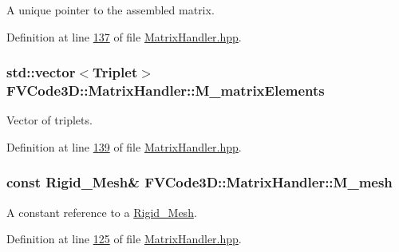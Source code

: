 A unique pointer to the assembled matrix. 



Definition at line \hyperlink{MatrixHandler_8hpp_source_l00137}{137} of file \hyperlink{MatrixHandler_8hpp_source}{Matrix\+Handler.\+hpp}.

\subsubsection[{\texorpdfstring{M\+\_\+matrix\+Elements}{M_matrixElements}}]{\setlength{\rightskip}{0pt plus 5cm}std\+::vector$<${\bf Triplet}$>$ F\+V\+Code3\+D\+::\+Matrix\+Handler\+::\+M\+\_\+matrix\+Elements\hspace{0.3cm}{\ttfamily [protected]}}\hypertarget{classFVCode3D_1_1MatrixHandler_a0bbdfb8d779ca20d8ba69b99cac1f4d6}{}\label{classFVCode3D_1_1MatrixHandler_a0bbdfb8d779ca20d8ba69b99cac1f4d6}


Vector of triplets. 



Definition at line \hyperlink{MatrixHandler_8hpp_source_l00139}{139} of file \hyperlink{MatrixHandler_8hpp_source}{Matrix\+Handler.\+hpp}.

\subsubsection[{\texorpdfstring{M\+\_\+mesh}{M_mesh}}]{\setlength{\rightskip}{0pt plus 5cm}const {\bf Rigid\+\_\+\+Mesh}\& F\+V\+Code3\+D\+::\+Matrix\+Handler\+::\+M\+\_\+mesh\hspace{0.3cm}{\ttfamily [protected]}}\hypertarget{classFVCode3D_1_1MatrixHandler_a72f185cb557fc2e8023bd09a074f685c}{}\label{classFVCode3D_1_1MatrixHandler_a72f185cb557fc2e8023bd09a074f685c}


A constant reference to a \hyperlink{classFVCode3D_1_1Rigid__Mesh}{Rigid\+\_\+\+Mesh}. 



Definition at line \hyperlink{MatrixHandler_8hpp_source_l00125}{125} of file \hyperlink{MatrixHandler_8hpp_source}{Matrix\+Handler.\+hpp}.

